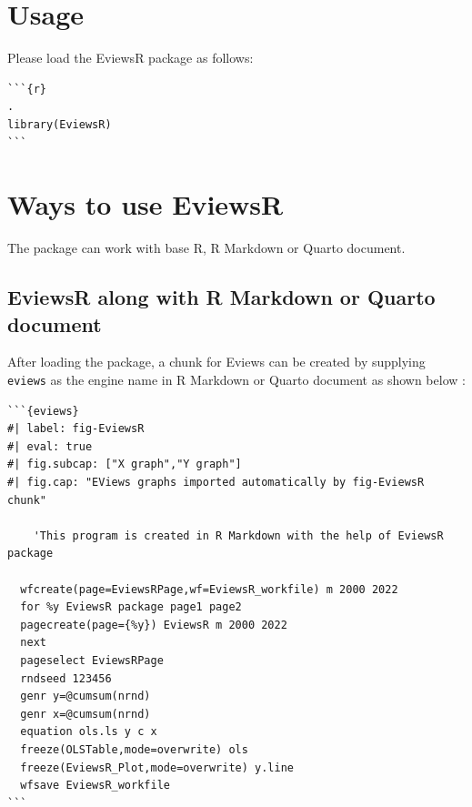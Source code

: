 \documentclass[
  letterpaper,
  DIV=11,
  numbers=noendperiod]{scrartcl}
\begin{document}
\hypertarget{usage}{%
\section{Usage}\label{usage}}

Please load the EviewsR package as follows:

\begin{verbatim}
```{r}                                                                .
library(EviewsR)
```
\end{verbatim}

\hypertarget{ways-to-use-eviewsr}{%
\section{Ways to use EviewsR}\label{ways-to-use-eviewsr}}

The package can work with base R, R Markdown or Quarto document.

\hypertarget{eviewsr-along-with-r-markdown-or-quarto-document}{%
\subsection{EviewsR along with R Markdown or Quarto
document}\label{eviewsr-along-with-r-markdown-or-quarto-document}}

After loading the package, a chunk for Eviews can be created by
supplying \texttt{eviews} as the engine name in R Markdown or Quarto
document as shown below :

\begin{verbatim}
```{eviews} 
#| label: fig-EviewsR
#| eval: true
#| fig.subcap: ["X graph","Y graph"]
#| fig.cap: "EViews graphs imported automatically by fig-EviewsR chunk"

    'This program is created in R Markdown with the help of EviewsR package
  
  wfcreate(page=EviewsRPage,wf=EviewsR_workfile) m 2000 2022
  for %y EviewsR package page1 page2
  pagecreate(page={%y}) EviewsR m 2000 2022
  next
  pageselect EviewsRPage
  rndseed 123456
  genr y=@cumsum(nrnd)
  genr x=@cumsum(nrnd)
  equation ols.ls y c x
  freeze(OLSTable,mode=overwrite) ols
  freeze(EviewsR_Plot,mode=overwrite) y.line
  wfsave EviewsR_workfile
```  
\end{verbatim}
\end{document}
